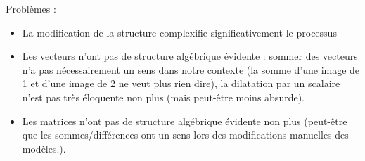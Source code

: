 \documentclass[11pt,a4paper]{article}
\begin{document}
	Problèmes : 
	\begin{itemize}
	
		\item La modification de la structure complexifie significativement le processus
	
		\item Les vecteurs n'ont pas de structure algébrique évidente : sommer des vecteurs n'a pas nécessairement un sens dans notre contexte (la somme d'une image de 1 et d'une image de 2 ne veut plus rien dire), la dilatation par un scalaire n'est pas très éloquente non plus (mais peut-être moins absurde).
		
		\item Les matrices n'ont pas de structure algébrique évidente non plus (peut-être que les sommes/différences ont un sens lors des modifications manuelles des modèles.).
		
	\end{itemize}		
\end{document}
